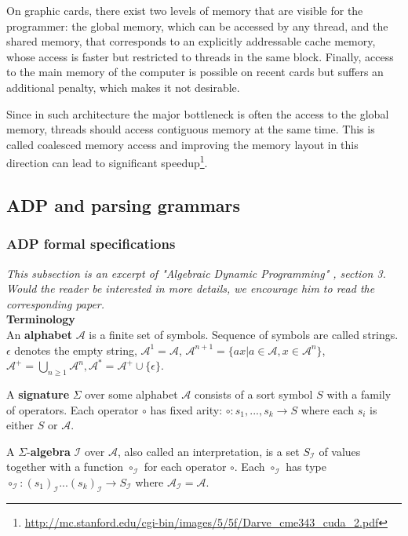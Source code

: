 On graphic cards, there exist two levels of memory that are visible for the programmer: the global memory, which can be accessed by any thread, and the shared memory, that corresponds to an explicitly addressable cache memory, whose access is faster but restricted to threads in the same block. Finally, access to the main memory of the computer is possible on recent cards but suffers an additional penalty, which makes it not desirable.

Since in such architecture the major bottleneck is often the access to the global memory, threads should access contiguous memory at the same time. This is called coalesced memory access and improving the memory layout in this direction can lead to significant speedup\footnote{\url{http://mc.stanford.edu/cgi-bin/images/5/5f/Darve_cme343_cuda_2.pdf}}.

\newpage
\subsection{ADP and parsing grammars} \label{adp_grammar}
\subsubsection{ADP formal specifications}
\textit{This subsection is an excerpt of "Algebraic Dynamic Programming" \cite{adp}, section 3. Would the reader be interested in more details, we encourage him to read the corresponding paper.} \\[6pt]
\textbf{Terminology}\\
An \textbf{alphabet} $\mathcal{A}$ is a finite set of symbols. Sequence of symbols are called strings. $\epsilon$ denotes the empty string, $\mathcal{A}^1=\mathcal{A}$, $\mathcal{A}^{n+1}=\{ax|a\in\mathcal{A},x\in\mathcal{A}^n\}$, $\mathcal{A}^+=\bigcup_{n\ge 1}\mathcal{A}^n,\mathcal{A}^*=\mathcal{A}^+\cup\{\epsilon\}$.

A \textbf{signature} $\Sigma$ over some alphabet $\mathcal{A}$ consists of a sort symbol $S$ with a family of operators. Each operator $\circ$ has fixed arity: $\circ:s_1,...,s_k\to S$ where each $s_i$ is either $S$ or $\mathcal{A}$.

A $\Sigma$-\textbf{algebra} $\mathcal{I}$ over $\mathcal{A}$, also called an interpretation, is a set $S_\mathcal{I}$ of values together with a function $\circ_\mathcal{I}$ for each operator $\circ$. Each $\circ_\mathcal{I}$ has type $\circ_\mathcal{I}: (s_1)_\mathcal{I} ...(s_k)_\mathcal{I} \to S_\mathcal{I}$ where $\mathcal{A}_\mathcal{I} = \mathcal{A}$.

